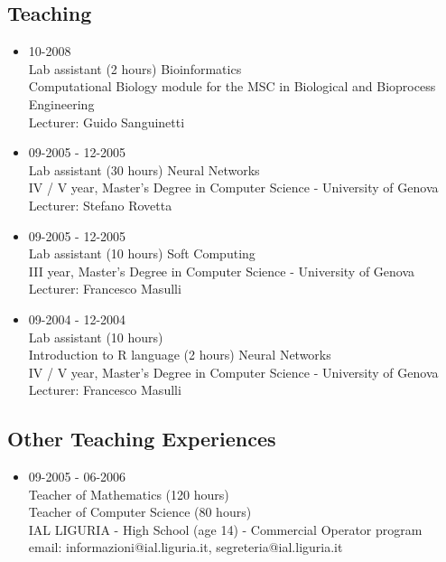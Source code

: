 \documentclass[a4paper,10pt]{article}
\begin{document}
\subsection*{Teaching}
\begin{itemize}
\item 10-2008 \\
  Lab assistant (2 hours)
  Bioinformatics \\
  Computational Biology module for the MSC in Biological and Bioprocess Engineering \\
  Lecturer: Guido Sanguinetti \\
\item 09-2005 - 12-2005 \\
  Lab assistant (30 hours)
  Neural Networks \\
  IV / V year, Master's Degree in Computer Science - University of Genova \\
  Lecturer: Stefano Rovetta \\
\item 09-2005 - 12-2005 \\
  Lab assistant (10 hours)
  Soft Computing \\
  III year, Master's Degree in Computer Science - University of Genova \\
  Lecturer: Francesco Masulli \\
\item 09-2004 - 12-2004 \\
  Lab assistant (10 hours) \\
  Introduction to R language (2 hours)
  Neural Networks \\
  IV / V year, Master's Degree in Computer Science - University of Genova \\
  Lecturer: Francesco Masulli \\
\end{itemize}

\subsection*{Other Teaching Experiences}
\begin{itemize}
\item 09-2005 - 06-2006 \\
  Teacher of Mathematics (120 hours) \\
  Teacher of Computer Science (80 hours) \\  
  IAL LIGURIA - High School (age 14) - Commercial Operator program \\
  email: informazioni@ial.liguria.it, segreteria@ial.liguria.it
\end{itemize}
\end{document}
